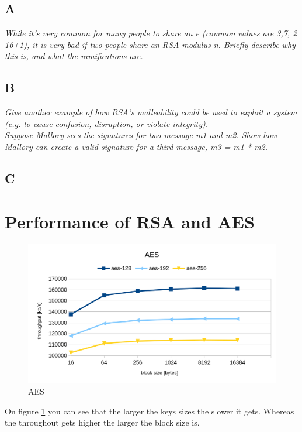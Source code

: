 \subsection{A}
\textit{While it's very common for many people to share an e (common values are 3,7, 2 16+1), it is very bad if two people share an RSA modulus n. Briefly describe why this is, and what the ramifications are.}\\

\subsection{B}
\textit{Give another example of how RSA’s malleability could be used to exploit a system (e.g. to cause confusion, disruption, or violate integrity).}\\

\textit{Suppose Mallory sees the signatures for two message m1 and m2.  Show how Mallory can create a valid signature for a third message, m3 = m1 * m2.}\\

\subsection{C}


\section{Performance of RSA and AES}

\begin{figure}[htp]
    \centering
    \caption{AES}
    \label{fig:aes}
    \includegraphics[width=\textwidth]{aes.png}
\end{figure}

On figure \ref{fig:aes} you can see that the larger the keys sizes the slower it gets. Whereas the throughout gets higher the larger the block size is.

